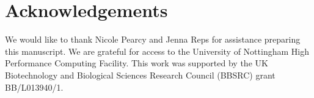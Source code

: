 \documentclass[sigconf]{acmart}
\begin{document}
\section*{Acknowledgements}
We would like to thank Nicole Pearcy and Jenna Reps for assistance preparing this manuscript.
We are grateful for access to the University of Nottingham High Performance Computing Facility.
This work was supported by the UK Biotechnology and Biological Sciences Research Council (BBSRC) grant BB/L013940/1.

 

\end{document}
